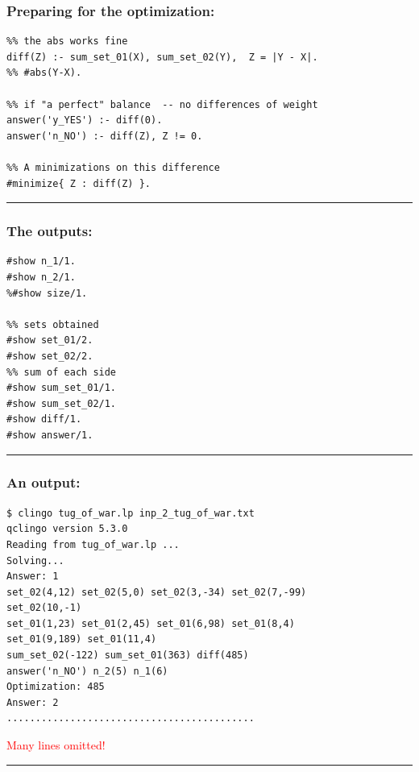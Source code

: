 \documentclass{beamer}
\begin{document}


\begin{frame}[fragile]
	\frametitle{Preparing for the optimization:}

{\small
\begin{verbatim}
%% the abs works fine
diff(Z) :- sum_set_01(X), sum_set_02(Y),  Z = |Y - X|. 
%% #abs(Y-X).

%% if "a perfect" balance  -- no differences of weight
answer('y_YES') :- diff(0).
answer('n_NO') :- diff(Z), Z != 0.

%% A minimizations on this difference
#minimize{ Z : diff(Z) }.

\end{verbatim}
}	
\textcolor{red}{\rule{\textwidth}{1.7pt} } 
\end{frame}
\begin{frame}[fragile]
	\frametitle{The outputs:}

{\small
\begin{verbatim}
#show n_1/1. 
#show n_2/1.
%#show size/1.

%% sets obtained
#show set_01/2. 
#show set_02/2.
%% sum of each side 
#show sum_set_01/1.
#show sum_set_02/1.
#show diff/1.
#show answer/1.
\end{verbatim}
}	
\textcolor{red}{\rule{\textwidth}{1.7pt} } 
\end{frame}




\begin{frame} [fragile]
\frametitle{An output:}
	
{\small
\begin{verbatim}
$ clingo tug_of_war.lp inp_2_tug_of_war.txt 
qclingo version 5.3.0
Reading from tug_of_war.lp ...
Solving...
Answer: 1
set_02(4,12) set_02(5,0) set_02(3,-34) set_02(7,-99) 
set_02(10,-1) 
set_01(1,23) set_01(2,45) set_01(6,98) set_01(8,4) 
set_01(9,189) set_01(11,4) 
sum_set_02(-122) sum_set_01(363) diff(485) 
answer('n_NO') n_2(5) n_1(6)
Optimization: 485
Answer: 2
...........................................
\end{verbatim}
\textcolor{red}{Many lines omitted!}\\
\textcolor{red}{\rule{\textwidth}{1.7pt} } 
}	
\end{frame}
\end{document}
